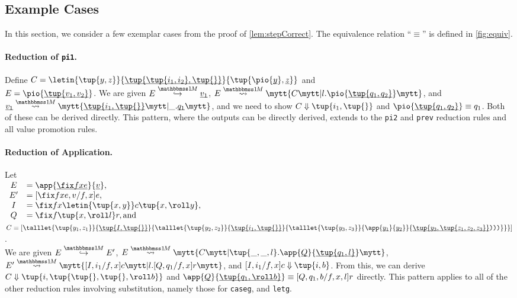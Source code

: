 \begin{abstrsyn}
\subsection{Example Cases}

In this section, we consider a few exemplar cases 
from the proof of \ref{lem:stepCorrect}.
The equivalence relation ``$\equiv$'' is defined in \ref{fig:equiv}.

\paragraph{Reduction of {\tt pi1}.}
Define 
$C = \letin{\tup{y,z}}{\exv{\tup{\tup {i_1,i_2},\tup{}}}}{\tup{\pio {\exv y},\exv z}}$ and \\
\mbox{$E = \pio {\exv{\tup {v_1,v_2}}}$}.
We are given $\stepmix  E {\exv {v_1}}$,
$\splitone E A C {l.\pio {\exv {\tup{q_1,q_2}}}}$, and
$\splitone {\exv {v_1}} A {\exv {\tup{i_1,\tup{}}}} {\_.\exv{q_1}}$,
and we need to show \mbox{$\reduce C {\tup {i_1,\tup{}}}$}
and \mbox{$\pio {\exv {\tup{q_1,q_2}}} \equiv q_1$}.
Both of these can be derived directly.
This pattern, where the outputs can be directly derived, extends to the {\tt pi2} and {\tt prev} reduction rules and all value promotion rules.

\paragraph{Reduction of Application.} Let \\
$\begin{array}{cl}
E &= \app {\exv{\fix f x e}} {\exv v}, \\
E' &= [\fix fxe, v/f,x] e, \\ 
I &= \fix f x {\letin {\tup{x,y}} c {\tup{x,\roll y}}}, \\
Q &= \fix f {\tup{x,\roll l}} r, \text{and}
\end{array}$
$C = \left[
\talllet{\tup{y_1,z_1}}{\exv {\tup {I,\tup{}}}}{
\talllet{\tup{y_2,z_2}} {\exv {\tup {i_1,\tup{}}}}{
\talllet{\tup{y_3,z_3}}{\app{\exv {y_1}}{\exv {y_2}}}{\exv{\tup{y_3,\tup{z_1,z_2,z_3}}}\ttrpar\ttrpar\ttrpar}}}\right]$.
\\
We are given $\stepmix E {E'}$,
$\splitone E A C {\tup{\_,\_,l}.\app{\exv Q}{\exv{\tup{q_1,l}}}}$, \\
$\splitone {E'} A {[I,i_1/f,x]c} {l.[Q,q_1/f,x]r}$,
and $\reduce {[I,i_1/f,x]c} {\tup{i,b}}$.
From this, we can derive $\reduce C {\tup{i,\tup {\tup{},\tup{},\roll b}}}$
and \mbox{$\app{\exv Q}{\exv{\tup{q_1,\roll b}}} \equiv [Q,q_1,b/f,x,l] r$} directly.
This pattern applies to all of the other reduction rules involving substitution,
namely those for {\tt caseg}, and {\tt letg}. 


\end{abstrsyn}
